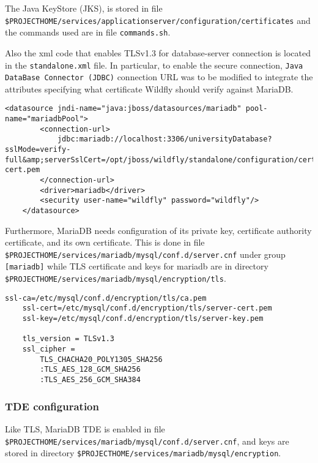 The Java KeyStore (JKS), is stored in file \\\texttt{\$PROJECT\textunderscore HOME/services/application\textunderscore server/configuration/certificates} and the commands used are in file \texttt{commands.sh}.

Also the xml code that enables TLSv1.3 for database-server connection is located in the \texttt{standalone.xml} file.
In particular, to enable the secure connection, \texttt{Java DataBase Connector (JDBC)} connection URL was to be modified to integrate the attributes specifying what certificate Wildfly should verify against MariaDB\cite{online:TlsJdbc}.

\begin{lstlisting}[style=XMLStyle]
    <datasource jndi-name="java:jboss/datasources/mariadb" pool-name="mariadbPool">
        <connection-url>
            jdbc:mariadb://localhost:3306/universityDatabase?sslMode=verify-full&amp;serverSslCert=/opt/jboss/wildfly/standalone/configuration/certificates/server-cert.pem
        </connection-url>
        <driver>mariadb</driver>
        <security user-name="wildfly" password="wildfly"/>
    </datasource>
\end{lstlisting}

Furthermore, MariaDB needs configuration of its private key, certificate authority certificate, and its own certificate. This is done in file \\\texttt{\$PROJECT\textunderscore HOME/services/mariadb/mysql/conf.d/server.cnf} under group \texttt{[mariadb]} while TLS certificate and keys for mariadb are in directory \texttt{\$PROJECT\textunderscore HOME/services/mariadb/mysql/encryption/tls}.

\begin{lstlisting}[style=XMLStyle]
    ssl-ca=/etc/mysql/conf.d/encryption/tls/ca.pem
    ssl-cert=/etc/mysql/conf.d/encryption/tls/server-cert.pem
    ssl-key=/etc/mysql/conf.d/encryption/tls/server-key.pem
    
    tls_version = TLSv1.3
    ssl_cipher = 
        TLS_CHACHA20_POLY1305_SHA256
        :TLS_AES_128_GCM_SHA256
        :TLS_AES_256_GCM_SHA384
\end{lstlisting}

\subsubsection{TDE configuration}

Like TLS, MariaDB TDE is enabled in file \texttt{\$PROJECT\textunderscore HOME/services/mariadb/mysql/conf.d/server.cnf}, and keys are stored in directory \texttt{\$PROJECT\textunderscore HOME/services/mariadb/mysql/encryption}.

